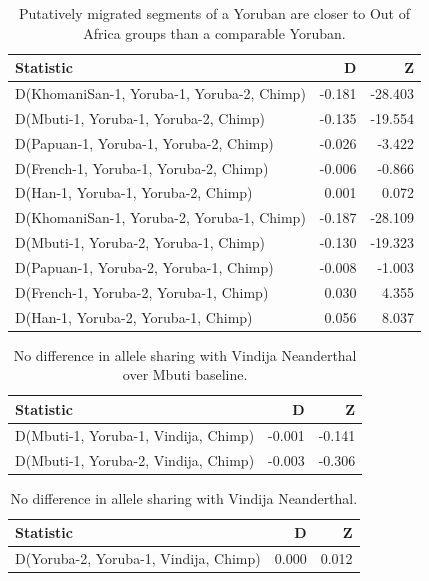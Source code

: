 \documentclass{article}
\begin{document}
\begin{table}[ht]
\centering
\begin{tabular}{lrr}
  \hline
Statistic & D & Z \\ 
  \hline
D(KhomaniSan-1, Yoruba-1, Yoruba-2, Chimp) & -0.181 & -28.403 \\ 
  D(Mbuti-1, Yoruba-1, Yoruba-2, Chimp) & -0.135 & -19.554 \\ 
  D(Papuan-1, Yoruba-1, Yoruba-2, Chimp) & -0.026 & -3.422 \\ 
  D(French-1, Yoruba-1, Yoruba-2, Chimp) & -0.006 & -0.866 \\ 
  D(Han-1, Yoruba-1, Yoruba-2, Chimp) & 0.001 & 0.072 \\ 
  D(KhomaniSan-1, Yoruba-2, Yoruba-1, Chimp) & -0.187 & -28.109 \\ 
  D(Mbuti-1, Yoruba-2, Yoruba-1, Chimp) & -0.130 & -19.323 \\ 
  D(Papuan-1, Yoruba-2, Yoruba-1, Chimp) & -0.008 & -1.003 \\ 
  D(French-1, Yoruba-2, Yoruba-1, Chimp) & 0.030 & 4.355 \\ 
  D(Han-1, Yoruba-2, Yoruba-1, Chimp) & 0.056 & 8.037 \\ 
   \hline
\end{tabular}
\caption{Putatively migrated segments of a Yoruban are closer to Out of Africa groups than a comparable Yoruban.} 
\label{dstats:a1}
\end{table}

\begin{table}[ht]
\centering
\begin{tabular}{lrr}
  \hline
Statistic & D & Z \\ 
  \hline
D(Mbuti-1, Yoruba-1, Vindija, Chimp) & -0.001 & -0.141 \\ 
  D(Mbuti-1, Yoruba-2, Vindija, Chimp) & -0.003 & -0.306 \\ 
   \hline
\end{tabular}
\caption{No difference in allele sharing with Vindija Neanderthal over Mbuti baseline.} 
\label{dstats:a5}
\end{table}

\begin{table}[ht]
\centering
\begin{tabular}{lrr}
  \hline
Statistic & D & Z \\ 
  \hline
D(Yoruba-2, Yoruba-1, Vindija, Chimp) & 0.000 & 0.012 \\ 
   \hline
\end{tabular}
\caption{No difference in allele sharing with Vindija Neanderthal.} 
\label{dstats:a4}
\end{table}
\end{document}
